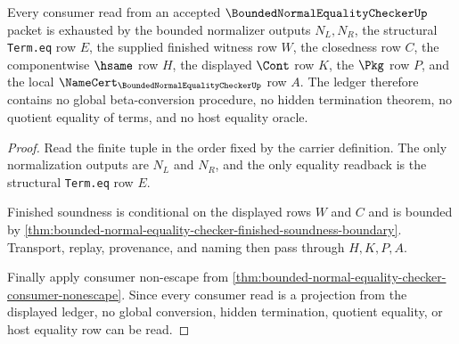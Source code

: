 \begin{theorem}
\label{thm:bounded-normal-equality-checker-ledger-exactness-row}
Every consumer read from an accepted $\BoundedNormalEqualityCheckerUp$ packet
is exhausted by the bounded normalizer outputs $N_L,N_R$, the structural
\texttt{Term.eq} row $E$, the supplied finished witness row $W$, the
closedness row $C$, the componentwise $\hsame$ row $H$, the displayed
$\Cont$ row $K$, the $\Pkg$ row $P$, and the local
$\NameCert_{\BoundedNormalEqualityCheckerUp}$ row $A$. The ledger therefore
contains no global beta-conversion procedure, no hidden termination theorem,
no quotient equality of terms, and no host equality oracle.
\end{theorem}
\begin{proof}
Read the finite tuple in the order fixed by the carrier definition. The only
normalization outputs are $N_L$ and $N_R$, and the only equality readback is
the structural \texttt{Term.eq} row $E$.

Finished soundness is conditional on the displayed rows $W$ and $C$ and is
bounded by \autoref{thm:bounded-normal-equality-checker-finished-soundness-boundary}.
Transport, replay, provenance, and naming then pass through $H,K,P,A$.

Finally apply consumer non-escape from
\autoref{thm:bounded-normal-equality-checker-consumer-nonescape}. Since every
consumer read is a projection from the displayed ledger, no global
conversion, hidden termination, quotient equality, or host equality row can
be read.
\end{proof}

